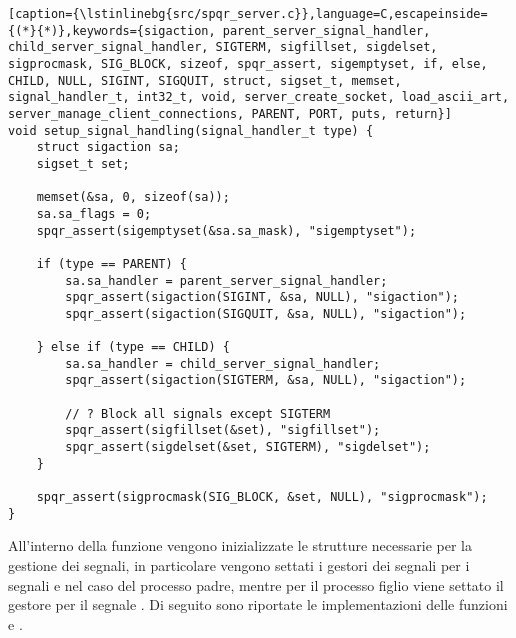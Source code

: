 \begin{lstlisting}[caption={\lstinlinebg{src/spqr_server.c}},language=C,escapeinside={(*}{*)},keywords={sigaction, parent_server_signal_handler, child_server_signal_handler, SIGTERM, sigfillset, sigdelset, sigprocmask, SIG_BLOCK, sizeof, spqr_assert, sigemptyset, if, else, CHILD, NULL, SIGINT, SIGQUIT, struct, sigset_t, memset, signal_handler_t, int32_t, void, server_create_socket, load_ascii_art, server_manage_client_connections, PARENT, PORT, puts, return}]
void setup_signal_handling(signal_handler_t type) {
    struct sigaction sa;
    sigset_t set;

    memset(&sa, 0, sizeof(sa));
    sa.sa_flags = 0;
    spqr_assert(sigemptyset(&sa.sa_mask), "sigemptyset");

    if (type == PARENT) {
        sa.sa_handler = parent_server_signal_handler;
        spqr_assert(sigaction(SIGINT, &sa, NULL), "sigaction");
        spqr_assert(sigaction(SIGQUIT, &sa, NULL), "sigaction");

    } else if (type == CHILD) {
        sa.sa_handler = child_server_signal_handler;
        spqr_assert(sigaction(SIGTERM, &sa, NULL), "sigaction");

        // ? Block all signals except SIGTERM
        spqr_assert(sigfillset(&set), "sigfillset");
        spqr_assert(sigdelset(&set, SIGTERM), "sigdelset");
    }

    spqr_assert(sigprocmask(SIG_BLOCK, &set, NULL), "sigprocmask");
}
\end{lstlisting}

All'interno della funzione  vengono inizializzate le strutture necessarie per la gestione dei segnali, in particolare vengono settati i gestori dei segnali per i segnali  e  nel caso del processo padre, mentre per il processo figlio viene settato il gestore per il segnale .
Di seguito sono riportate le implementazioni delle funzioni  e .

